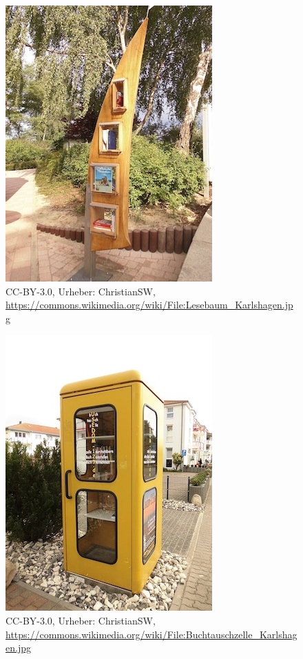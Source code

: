 \documentclass[a4paper,
fontsize=11pt,
oneside,
numbers=noperiodatend,
parskip=half-,
bibliography=totoc,
final
]{scrartcl}
\begin{document}
\begin{figure}[htbp]
\centering
\includegraphics{img/LesebaumKarlshagen.jpg}
\caption{CC-BY-3.0, Urheber: ChristianSW,
\url{https://commons.wikimedia.org/wiki/File:Lesebaum_Karlshagen.jpg}}
\end{figure}

\begin{figure}[htbp]
\centering
\includegraphics{img/BuchtauschzelleKarlshagen.jpg}
\caption{CC-BY-3.0, Urheber: ChristianSW,
\url{https://commons.wikimedia.org/wiki/File:Buchtauschzelle_Karlshagen.jpg}}
\end{figure}
\end{document}
